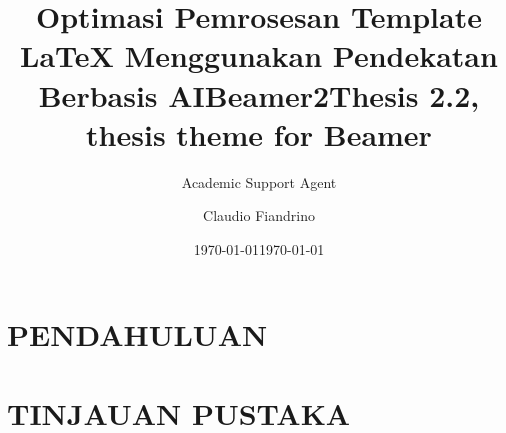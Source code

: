 \documentclass{beamer}
\title{Optimasi Pemrosesan Template LaTeX Menggunakan Pendekatan Berbasis AI}
\author{Academic Support Agent}
\date{\today}
\begin{document}
\maketitle

\begin{abstract}

\end{abstract}

\chapter{PENDAHULUAN}


\chapter{TINJAUAN PUSTAKA}


                        
\usepackage[beamer,customcolors]{hf-tikz}

\author{Claudio Fiandrino}
\title{Beamer2Thesis 2.2, thesis theme for Beamer}
\date{\today}
\end{document}
